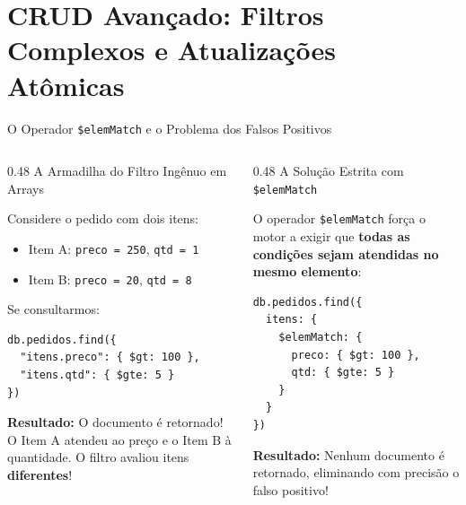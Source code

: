 \section[CRUD Avançado: Filtros e Atualizações Atômicas]{CRUD Avançado: Filtros Complexos e Atualizações Atômicas}

\begin{frame}[fragile]{O Operador \texttt{\$elemMatch} e o Problema dos Falsos Positivos}
  \vspace{0.05cm}
  \begin{columns}[t]
    \begin{column}{0.48\textwidth}
      \alert{A Armadilha do Filtro Ingênuo em Arrays}\par
      \scriptsize
      Considere o pedido com dois itens:
      \begin{itemize}
        \item Item A: \texttt{preco = 250}, \texttt{qtd = 1}
        \item Item B: \texttt{preco = 20}, \texttt{qtd = 8}
      \end{itemize}
      Se consultarmos:
      \begin{lstlisting}[language=mongosh]
db.pedidos.find({
  "itens.preco": { $gt: 100 },
  "itens.qtd": { $gte: 5 }
})
      \end{lstlisting}
      \textbf{Resultado:} O documento é retornado! O Item A atendeu ao preço e o Item B à quantidade. O filtro avaliou itens \textbf{diferentes}!
    \end{column}
    \begin{column}{0.48\textwidth}
      \alert{A Solução Estrita com \texttt{\$elemMatch}}\par
      \scriptsize
      O operador \texttt{\$elemMatch} força o motor a exigir que \textbf{todas as condições sejam atendidas no mesmo elemento}:
      \begin{lstlisting}[language=mongosh]
db.pedidos.find({
  itens: {
    $elemMatch: {
      preco: { $gt: 100 },
      qtd: { $gte: 5 }
    }
  }
})
      \end{lstlisting}
      \textbf{Resultado:} Nenhum documento é retornado, eliminando com precisão o falso positivo!
    \end{column}
  \end{columns}
\end{frame}

